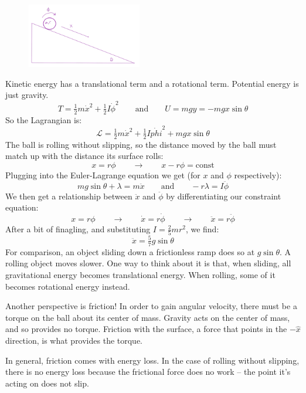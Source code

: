 \documentclass[12pt]{article}
\newcommand{\purple}[1]{{\color{purple} #1}}
\begin{document}
\purple{

\begin{figure}[h]
\includegraphics[width=5cm]{rolling-down-ramp.png}
\centering
\end{figure}

Kinetic energy has a translational term and a rotational term. Potential energy is just gravity.
$$
T = \tfrac{1}{2} m \dot{x}^2 + \tfrac{1}{2} I \dot{\phi}^2
\quad\quad\text{and}\quad\quad
U = mgy = -mg x \sin \theta
$$
So the Lagrangian is:
$$
\mathcal{L} = \tfrac{1}{2} m \dot{x}^2 + \tfrac{1}{2} I \dot{phi}^2 + mg x \sin \theta
$$
The ball is rolling without slipping, so the distance moved by the ball must match up with the distance its surface rolls:
$$
x = r \phi
\quad\quad\rightarrow\quad\quad
x - r\phi = \text{const}
$$
Plugging into the Euler-Lagrange equation we get (for $x$ and $\phi$ respectively):
$$
mg\sin\theta + \lambda = m\ddot{x}
\quad\quad\text{and}\quad\quad
-r\lambda = I \ddot{\phi}
$$
We then get a relationship between $\ddot{x}$ and $\ddot{\phi}$ by differentiating our constraint equation:
$$
x = r \phi
\quad\quad\rightarrow\quad\quad
\dot{x} = r\dot{\phi}
\quad\quad\rightarrow\quad\quad
\ddot{x} = r\ddot{\phi}
$$
After a bit of finagling, and substituting $I=\tfrac{2}{5} m r^2$, we find:
$$
\ddot{x} = \tfrac{5}{7} g \sin\theta
$$
For comparison, an object sliding down a frictionless ramp does so at $g\sin\theta$. A rolling object moves slower. One way to think about it is that, when sliding, all gravitational energy becomes translational energy. When rolling, some of it becomes rotational energy instead. 

Another perspective is friction! In order to gain angular velocity, there must be a torque on the ball about its center of mass. Gravity acts on the center of mass, and so provides no torque. Friction with the surface, a force that points in the $-\hat{x}$ direction, is what provides the torque. 

In general, friction comes with energy loss. In the case of rolling without slipping, there is no energy loss because the frictional force does no work -- the point it's acting on does not slip.

}
\end{document}

